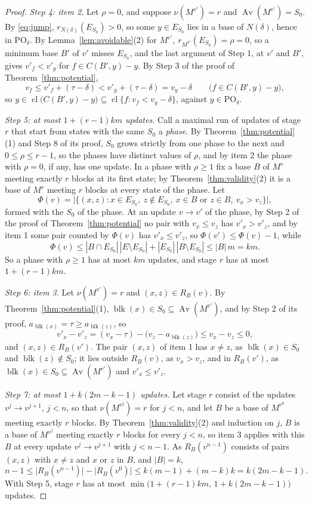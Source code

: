 \documentclass[11pt]{article}
\newcommand{\cl}{\operatorname{cl}}
\newcommand{\blk}{\operatorname{blk}}
\newcommand{\PO}{\mathrm{PO}}
\newcommand{\Av}{\operatorname{Av}}
\begin{document}
\begin{proof}
\emph{Step 4: item 2.}  Let $\rho=0$, and suppose $\nu(M^{v'})=r$ and
$\Av(M^{v'})=S_0$.  By \eqref{eq:jump}, $r_{N(\delta)}(E_{S_0})>0$, so some
$y\in E_{S_0}$ lies in a base of $N(\delta)$, hence in $\PO_\delta$.  By
Lemma~\ref{lem:avoidable}(2) for $M^{v'}$, $r_{M^{v'}}(E_{S_0})=\rho=0$, so a
minimum base $B'$ of $v'$ misses $E_{S_0}$, and the last argument of Step 1, at
$v'$ and $B'$, gives $v'_f<v'_y$ for $f\in C(B',y)-y$.  By Step 3 of the proof of
Theorem~\ref{thm:potential},
\[
  v_f\le v'_f+(\tau-\delta)<v'_y+(\tau-\delta)=v_y-\delta\qquad\bigl(f\in C(B',y)-y\bigr),
\]
so $y\in\cl\bigl(C(B',y)-y\bigr)\subseteq\cl\{f:v_f<v_y-\delta\}$, against
$y\in\PO_\delta$.

\emph{Step 5: at most $1+(r-1)km$ updates.}  Call a maximal run of updates of stage $r$
that start
from states with the same $S_0$ a \emph{phase}.  By Theorem~\ref{thm:potential}(1)
and Step 8 of its proof, $S_0$ grows strictly from one phase to the next and
$0\le\rho\le r-1$, so the phases have distinct values of $\rho$, and by item 2 the
phase with $\rho=0$, if any, has one update.  In a phase with $\rho\ge1$ fix a
base $B$ of $M^{v}$ meeting exactly $r$ blocks at its first state; by Theorem~\ref{thm:validity}(2) it is a base of $M^{v}$
meeting $r$ blocks at every state of the phase.  Let
\[
  \Phi(v)=\bigl|\{(x,z):x\in E_{S_0},\ z\notin E_{S_0},\ x\in B\text{ or }z\in B,\
  v_x>v_z\}\bigr|,
\]
formed with the $S_0$ of the phase.  At an update $v\to v'$ of the phase, by Step 2
of the proof of Theorem~\ref{thm:potential} no pair with $v_x\le v_z$ has
$v'_x>v'_z$, and by item 1 some pair counted by $\Phi(v)$ has $v'_x\le v'_z$, so
$\Phi(v')\le\Phi(v)-1$, while
\[
  \Phi(v)\le|B\cap E_{S_0}|\,|E\setminus E_{S_0}|+|E_{S_0}|\,|B\setminus E_{S_0}|\le|B|\,m=km.
\]
So a phase with $\rho\ge1$ has at most $km$ updates, and stage $r$ has at most
$1+(r-1)km$.

\emph{Step 6: item 3.}  Let $\nu(M^{v'})=r$ and $(x,z)\in R_B(v)$.  By
Theorem~\ref{thm:potential}(1), $\blk(x)\in S_0\subseteq\Av(M^{v'})$, and by Step 2
of its proof, $a_{\blk(x)}=\tau\ge a_{\blk(z)}$, so
\[
  v'_x-v'_z=(v_x-\tau)-\bigl(v_z-a_{\blk(z)}\bigr)\le v_x-v_z\le0,
\]
and $(x,z)\in R_B(v')$.  The pair $(x,z)$ of item 1 has $x\ne z$, as $\blk(x)\in S_0$
and $\blk(z)\notin S_0$; it lies outside $R_B(v)$, as $v_x>v_z$, and in $R_B(v')$,
as $\blk(x)\in S_0\subseteq\Av(M^{v'})$ and $v'_x\le v'_z$.

\emph{Step 7: at most $1+k(2m-k-1)$ updates.}  Let stage $r$ consist of the updates
$v^{j}\to v^{j+1}$, $j<n$, so that $\nu(M^{v^{j}})=r$ for $j<n$, and let $B$ be a base
of $M^{v^{0}}$ meeting exactly $r$ blocks.  By Theorem~\ref{thm:validity}(2) and
induction on $j$, $B$ is a base of $M^{v^{j}}$ meeting exactly $r$ blocks for every
$j<n$, so item 3 applies with this $B$ at every update $v^{j}\to v^{j+1}$ with
$j<n-1$.  As $R_B(v^{n-1})$ consists of pairs $(x,z)$ with $x\ne z$ and $x$ or $z$
in $B$, and $|B|=k$,
\[
  n-1\le\bigl|R_B(v^{n-1})\bigr|-\bigl|R_B(v^{0})\bigr|\le k(m-1)+(m-k)k=k(2m-k-1).
\]
With Step 5, stage $r$ has at most $\min\bigl(1+(r-1)km,\,1+k(2m-k-1)\bigr)$ updates.
\end{proof}
\end{document}
